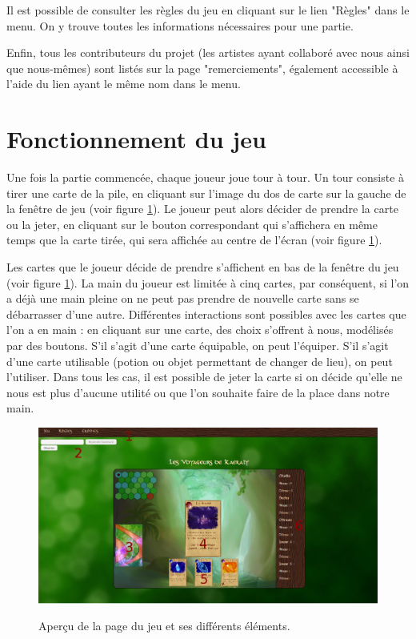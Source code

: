 \documentclass[12pt]{report}
\begin{document}
		Il est possible de consulter les règles du jeu en cliquant sur le lien 	"Règles" dans le menu. On y trouve toutes les informations nécessaires pour une partie.

		Enfin, tous les contributeurs du projet (les artistes ayant collaboré avec nous ainsi que nous-mêmes) sont listés sur la page "remerciements", également accessible à l'aide du lien ayant le même nom dans le menu.

	\section{Fonctionnement du jeu}
		Une fois la partie commencée, chaque joueur joue tour à tour. Un tour consiste à tirer une carte de la pile, en cliquant sur l'image du dos de carte sur la gauche de la fenêtre de jeu (voir figure \ref{fig:manual}). Le joueur peut alors décider de prendre la carte ou la jeter, en cliquant sur le bouton correspondant qui s'affichera en même temps que la carte tirée, qui sera affichée au centre de l'écran (voir figure \ref{fig:manual}).

		Les cartes que le joueur décide de prendre s'affichent en bas de la fenêtre du jeu (voir figure \ref{fig:manual}). La main du joueur est limitée à cinq cartes, par conséquent, si l'on a déjà une main pleine on ne peut pas prendre de nouvelle carte sans se débarrasser d'une autre. Différentes interactions sont possibles avec les cartes que l'on a en main : en cliquant sur une carte, des choix s'offrent à nous, modélisés par des boutons. S'il s'agit d'une carte équipable, on peut l'équiper. S'il s'agit d'une carte utilisable (potion ou objet permettant de changer de lieu), on peut l'utiliser. Dans tous les cas, il est possible de jeter la carte si on décide qu'elle ne nous est plus d'aucune utilité ou que l'on souhaite faire de la place dans notre main.

		\begin{figure}[h!]
			\centering
			\includegraphics[scale=0.35]{manual}
			\label{fig:manual}
			\caption{Aperçu de la page du jeu et ses différents éléments.}
		\end{figure}
\end{document}
